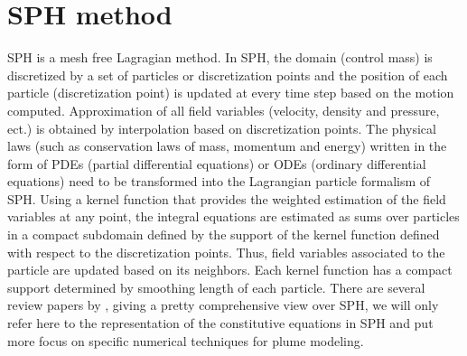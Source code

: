 \documentclass[journal abbreviation, manuscript]{copernicus}
\begin{document}
\section{SPH method} \label{sec:SPH_method}
SPH is a mesh free Lagragian method. In SPH, the domain (control mass) is discretized by a set of particles or discretization points and the position of each particle (discretization point) is updated at every time step based on the motion computed. Approximation of all field variables (velocity, density and pressure, ect.) is obtained by interpolation based on discretization points. The physical laws (such as conservation laws of mass, momentum and energy) written in the form of PDEs (partial differential equations)  or ODEs (ordinary differential equations) need to be transformed into the Lagrangian particle formalism of SPH. Using a kernel function that provides the weighted estimation of the field variables at any point, the integral equations are estimated as sums over particles in a compact subdomain defined by the support of the kernel function defined with respect to the discretization points. Thus, field variables associated to the particle are updated based on its neighbors. Each kernel function has a compact support determined by smoothing length of each particle. There are several review papers by \citet{monaghan1992smoothed, monaghan2005smoothed, rosswog2009astrophysical, price2012smoothed, monaghan2012smoothed}, giving a pretty comprehensive view over SPH, we will only refer here to the representation of the constitutive equations in SPH and put more focus on specific numerical techniques for plume modeling.
\end{document}
